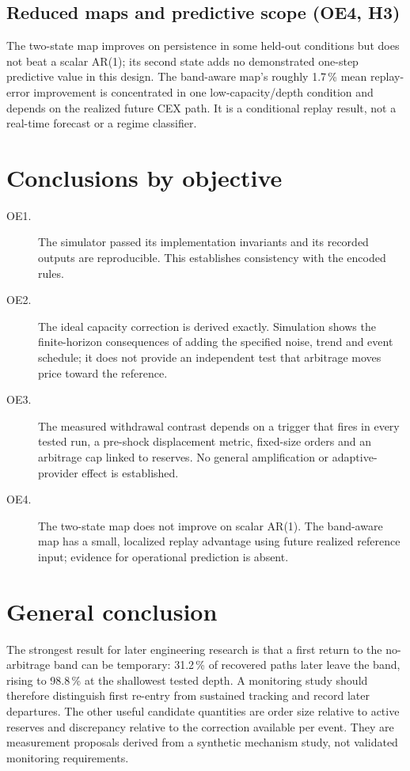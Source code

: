 \subsection{Reduced maps and predictive scope (OE4, H3)}

The two-state map improves on persistence in some held-out conditions but does not beat a scalar AR(1); its second state adds no demonstrated one-step predictive value in this design. The band-aware map's roughly 1.7\,\% mean replay-error improvement is concentrated in one low-capacity/depth condition and depends on the realized future CEX path. It is a conditional replay result, not a real-time forecast or a regime classifier.

\section{Conclusions by objective}

\begin{description}
  \item[OE1.] The simulator passed its implementation invariants and its recorded outputs are reproducible. This establishes consistency with the encoded rules.
  \item[OE2.] The ideal capacity correction is derived exactly. Simulation shows the finite-horizon consequences of adding the specified noise, trend and event schedule; it does not provide an independent test that arbitrage moves price toward the reference.
  \item[OE3.] The measured withdrawal contrast depends on a trigger that fires in every tested run, a pre-shock displacement metric, fixed-size orders and an arbitrage cap linked to reserves. No general amplification or adaptive-provider effect is established.
  \item[OE4.] The two-state map does not improve on scalar AR(1). The band-aware map has a small, localized replay advantage using future realized reference input; evidence for operational prediction is absent.
\end{description}

\section{General conclusion}

The strongest result for later engineering research is that a first return to the no-arbitrage band can be temporary: 31.2\,\% of recovered paths later leave the band, rising to 98.8\,\% at the shallowest tested depth. A monitoring study should therefore distinguish first re-entry from sustained tracking and record later departures. The other useful candidate quantities are order size relative to active reserves and discrepancy relative to the correction available per event. They are measurement proposals derived from a synthetic mechanism study, not validated monitoring requirements.

